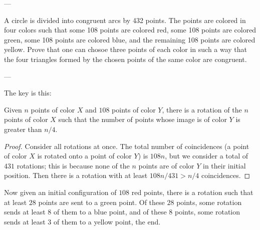 
---

A circle is divided into congruent arcs by 432 points. The points are colored in four colors such that some 108 points are colored red, some 108 points are colored green, some 108 points are colored blue, and the remaining 108 points are colored yellow. Prove that one can chosoe three points of each color in such a way that the four triangles formed by the chosen points of the same color are congruent.

---

The key is this:
\begin{iclaim*}
    Given $n$ points of color $X$ and $108$ points of color $Y$, there is a rotation of the $n$ points of color $X$ such that the number of points whose image is of color $Y$ is greater than $n/4$.
\end{iclaim*}
\begin{proof}
    Consider all rotations at once. The total number of coincidences (a point of color $X$ is rotated onto a point of color $Y$) is $108n$, but we consider a total of $431$ rotations; this is because none of the $n$ points are of color $Y$ in their initial position. Then there is a rotation with at least $108n/431>n/4$ coincidences.
\end{proof}

Now given an initial configuration of $108$ red points, there is a rotation such that at least $28$ points are sent to a green point. Of these $28$ points, some rotation sends at least $8$ of them to a blue point, and of these $8$ points, some rotation sends at least $3$ of them to a yellow point, the end.
